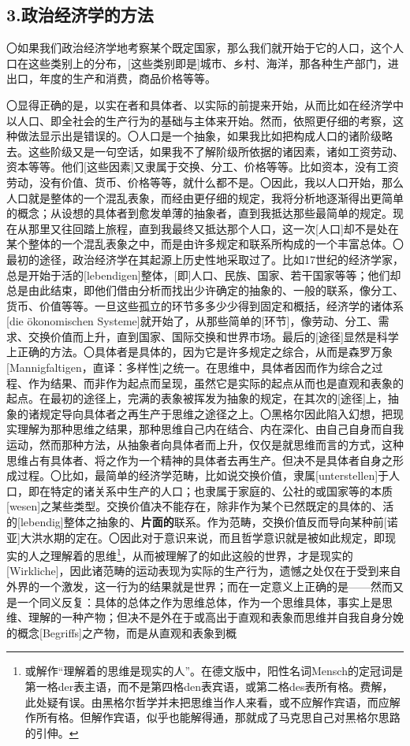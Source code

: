 \documentclass[a4paper,twoside,12pt]{ctexart}
\begin{document}
\newpage

\subsection{3.政治经济学的方法}

〇如果我们政治经济学地考察某个既定国家，那么我们就开始于它的人口，这个人口在这些类别上的分布，[这些类别即是]城市、乡村、海洋，那各种生产部门，进出口，年度的生产和消费，商品价格等等。

〇显得正确的是，以实在者和具体者、以实际的前提来开始，从而比如在经济学中以人口、即全社会的生产行为的基础与主体来开始。然而，依照更仔细的考察，这种做法显示出是错误的。〇人口是一个抽象，如果我比如把构成人口的诸阶级略去。这些阶级又是一句空话，如果我不了解阶级所依据的诸因素，诸如工资劳动、资本等等。他们[这些因素]又隶属于交换、分工、价格等等。比如资本，没有工资劳动，没有价值、货币、价格等等，就什么都不是。〇因此，我以人口开始，那么人口就是整体的一个混乱表象，而经由更仔细的规定，我将分析地逐渐得出更简单的概念；从设想的具体者到愈发单薄的抽象者，直到我抵达那些最简单的规定。现在从那里又往回踏上旅程，直到我最终又抵达那个人口，这一次[人口]却不是处在某个整体的一个混乱表象之中，而是由许多规定和联系所构成的一个丰富总体。〇最初的途径，政治经济学在其起源上历史性地采取过了。比如17世纪的经济学家，总是开始于活的[lebendigen]整体，[即]人口、民族、国家、若干国家等等；他们却总是由此结束，即他们借由分析而找出少许确定的抽象的、一般的联系，像分工、货币、价值等等。一旦这些孤立的环节多多少少得到固定和概括，经济学的诸体系[die ökonomischen Systeme]就开始了，从那些简单的[环节]，像劳动、分工、需求、交换价值而上升，直到国家、国际交换和世界市场。最后的[途径]显然是科学上正确的方法。〇具体者是具体的，因为它是许多规定之综合，从而是森罗万象[Mannigfaltigen，直译：多样性]之统一。在思维中，具体者因而作为综合之过程、作为结果、而非作为起点而呈现，虽然它是实际的起点从而也是直观和表象的起点。在最初的途径上，完满的表象被挥发为抽象的规定，在其次的[途径]上，抽象的诸规定导向具体者之再生产于思维之途径之上。〇黑格尔因此陷入幻想，把现实理解为那种思维之结果，那种思维自己内在结合、内在深化、由自己自身而自我运动，然而那种方法，从抽象者向具体者而上升，仅仅是就思维而言的方式，这种思维占有具体者、将之作为一个精神的具体者去再生产。但决不是具体者自身之形成过程。〇比如，最简单的经济学范畴，比如说交换价值，隶属[unterstellen]于人口，即在特定的诸关系中生产的人口；也隶属于家庭的、公社的或国家等的本质[wesen]之某些类型。交换价值决不能存在，除非作为某个已然既定的具体的、活的[lebendig]整体之抽象的、\textbf{片面的}联系。作为范畴，交换价值反而导向某种前[诺亚]大洪水期的定在。〇因此对于意识来说，而且哲学意识就是被如此规定，即现实的人之理解着的思维\footnote{或解作“理解着的思维是现实的人”。在德文版中，阳性名词Mensch的定冠词是第一格der表主语，而不是第四格den表宾语，或第二格des表所有格。费解，此处疑有误。由黑格尔哲学并未把思维当作人来看，或不应解作宾语，而应解作所有格。但解作宾语，似乎也能解得通，那就成了马克思自己对黑格尔思路的引伸。}，从而被理解了的如此这般的世界，才是现实的[Wirkliche]，因此诸范畴的运动表现为实际的生产行为，遗憾之处仅在于受到来自外界的一个激发，这一行为的结果就是世界；而在一定意义上正确的是——然而又是一个同义反复：具体的总体之作为思维总体，作为一个思维具体，事实上是思维、理解的一种产物；但决不是外在于或高出于直观和表象而思维并自我自身分娩的概念[Begriffs]之产物，而是从直观和表象到概
\end{document}
